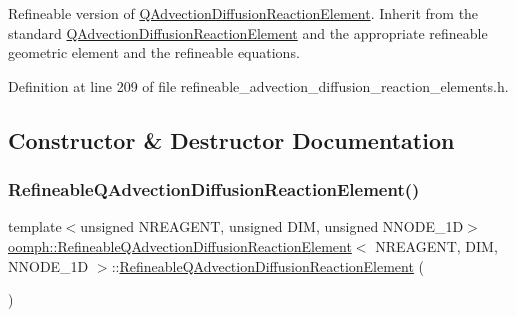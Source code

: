 Refineable version of \hyperlink{classoomph_1_1QAdvectionDiffusionReactionElement}{Q\+Advection\+Diffusion\+Reaction\+Element}. Inherit from the standard \hyperlink{classoomph_1_1QAdvectionDiffusionReactionElement}{Q\+Advection\+Diffusion\+Reaction\+Element} and the appropriate refineable geometric element and the refineable equations. 

Definition at line 209 of file refineable\+\_\+advection\+\_\+diffusion\+\_\+reaction\+\_\+elements.\+h.



\subsection{Constructor \& Destructor Documentation}
\mbox{\label{classoomph_1_1RefineableQAdvectionDiffusionReactionElement_a8c0b1503b0217e5c2fba14038aa6ac56}} 
\subsubsection{\texorpdfstring{Refineable\+Q\+Advection\+Diffusion\+Reaction\+Element()}{RefineableQAdvectionDiffusionReactionElement()}\hspace{0.1cm}{\footnotesize\ttfamily [1/2]}}
{\footnotesize\ttfamily template$<$unsigned N\+R\+E\+A\+G\+E\+NT, unsigned D\+IM, unsigned N\+N\+O\+D\+E\+\_\+1D$>$ \\
\hyperlink{classoomph_1_1RefineableQAdvectionDiffusionReactionElement}{oomph\+::\+Refineable\+Q\+Advection\+Diffusion\+Reaction\+Element}$<$ N\+R\+E\+A\+G\+E\+NT, D\+IM, N\+N\+O\+D\+E\+\_\+1D $>$\+::\hyperlink{classoomph_1_1RefineableQAdvectionDiffusionReactionElement}{Refineable\+Q\+Advection\+Diffusion\+Reaction\+Element} (\begin{DoxyParamCaption}{ }\end{DoxyParamCaption})\hspace{0.3cm}{\ttfamily [inline]}}



